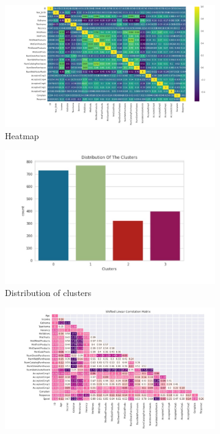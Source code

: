 \documentclass{josis}
\begin{document}
\begin{figure}
    \centering
    \begin{subfigure}[b]{0.45\textwidth}
        \centering
        \includegraphics[width=\textwidth]{heatmap.jpeg}
        \caption{Heatmap}
        \label{fig:subfig3}
    \end{subfigure}
    \hfill
    \begin{subfigure}[b]{0.45\textwidth}
        \centering
        \includegraphics[width=\textwidth]{distribution.jpeg}
        \caption{Distribution of clusters}
        \label{fig:subfig3}
    \end{subfigure}
    \hfill
    \begin{subfigure}[b]{0.45\textwidth}
        \centering
        \includegraphics[width=\textwidth]{correlation_Matrix.jpeg}

\end{subfigure}
\end{figure}
\end{document}
